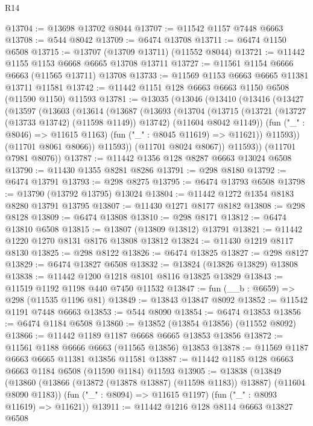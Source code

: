 \begin{lexlean}{R14}
\begin{coremodule}
{{{{{{{{{{{{{{{{{{{{{{{{{{{{{{{{{{{{{{{{{{{{{{{{{{{{{{{{{{{{{{{{{{{{{{{{{{{{{{{{{{@13704 := @13698 @13702 @8044
@13707 := @11542 @1157 @7448 @6663
@13708 := @544 @8042
@13709 := @6474 @13708
@13711 := @6474 @1150 @6508
@13715 := @13707 (@13709 @13711) (@11552 @8044)
@13721 := @11442 @1155 @1153 @6668 @6665 @13708 @13711
@13727 := @11561 @1154 @6666 @6663 (@11565 @13711) @13708
@13733 := @11569 @1153 @6663 @6665 @11381 @13711 @11581
@13742 := @11442 @1151 @128 @6663 @6663 @1150 @6508 (@11590 @1150) @11593
@13781 := @13035
    (@13046
      (@13410
        (@13416
          (@13427
            (@13597
              (@13603
                (@13614
                  (@13687
                    (@13693
                      (@13704
                        (@13715
                          (@13721 (@13727 (@13733 @13742) (@11598 @1149)) @13742)
                          (@11604 @8042 @1149))
                        (fun ("_" : @8046) => @11615 @1163)
                        (fun ("_" : @8045 @11619) => @11621))
                      @11593))
                  (@11701 @8061 @8066))
                @11593))
            (@11701 @8024 @8067))
          @11593))
      (@11701 @7981 @8076))
@13787 := @11442 @1356 @128 @8287 @6663 @13024 @6508
@13790 := @11430 @1355 @8281 @8286
@13791 := @298 @8180
@13792 := @6474 @13791
@13793 := @298 @8275
@13795 := @6474 @13793 @6508
@13798 := @13790 (@13792 @13795) @13024
@13804 := @11442 @1272 @1354 @8183 @8280 @13791 @13795
@13807 := @11430 @1271 @8177 @8182
@13808 := @298 @8128
@13809 := @6474 @13808
@13810 := @298 @8171
@13812 := @6474 @13810 @6508
@13815 := @13807 (@13809 @13812) @13791
@13821 := @11442 @1220 @1270 @8131 @8176 @13808 @13812
@13824 := @11430 @1219 @8117 @8130
@13825 := @298 @8122
@13826 := @6474 @13825
@13827 := @298 @8127
@13829 := @6474 @13827 @6508
@13832 := @13824 (@13826 @13829) @13808
@13838 := @11442 @1200 @1218 @8101 @8116 @13825 @13829
@13843 := @11519 @1192 @1198 @440 @7450 @11532
@13847 := fun (__b : @6659) => @298 (@11535 @1196 @81)
@13849 := @13843 @13847 @8092
@13852 := @11542 @1191 @7448 @6663
@13853 := @544 @8090
@13854 := @6474 @13853
@13856 := @6474 @1184 @6508
@13860 := @13852 (@13854 @13856) (@11552 @8092)
@13866 := @11442 @1189 @1187 @6668 @6665 @13853 @13856
@13872 := @11561 @1188 @6666 @6663 (@11565 @13856) @13853
@13878 := @11569 @1187 @6663 @6665 @11381 @13856 @11581
@13887 := @11442 @1185 @128 @6663 @6663 @1184 @6508 (@11590 @1184) @11593
@13905 := @13838
    (@13849
      (@13860 (@13866 (@13872 (@13878 @13887) (@11598 @1183)) @13887) (@11604 @8090 @1183))
      (fun ("_" : @8094) => @11615 @1197)
      (fun ("_" : @8093 @11619) => @11621))
@13911 := @11442 @1216 @128 @8114 @6663 @13827 @6508
}}}}}}}}}}}}}}}}}}}}}}}}}}}}}}}}}}}}}}}}}}}}}}}}}}}}}}}}}}}}}}}}}}}}}}}}}}}}}}}}}}
\end{coremodule}
\end{lexlean}
